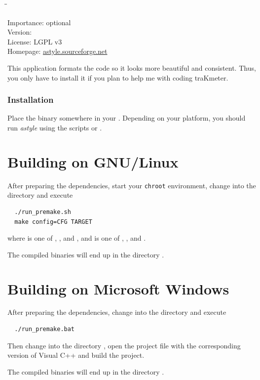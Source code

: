 \begin{tabbing}
  \hspace*{6em}\=\=\kill

  Importance:  \> optional \\
  Version:      \\
  License:     \> LGPL v3 \\
  Homepage:    \> \href{http://astyle.sourceforge.net/}{astyle.sourceforge.net}
\end{tabbing}

This application formats the code so it looks more beautiful and
consistent.  Thus, you only have to install it if you plan to help me
with coding traKmeter.

\subsubsection{Installation}

Place the binary somewhere in your .  Depending on your
platform, you should run \emph{astyle} using the scripts
 or .

\section{Building on GNU/Linux}

After preparing the dependencies, start your \texttt{chroot}
environment, change into the directory  and execute

\begin{verbatim}
  ./run_premake.sh
  make config=CFG TARGET
\end{verbatim}

where  is one of ,
,  and
, and  is one of
,
,
 and
.

The compiled binaries will end up in the directory .

\section{Building on Microsoft Windows}

After preparing the dependencies, change into the directory
 and execute

\begin{verbatim}
  ./run_premake.bat
\end{verbatim}

Then change into the directory , open the
project file with the corresponding version of Visual C++ and build
the project.

The compiled binaries will end up in the directory .






